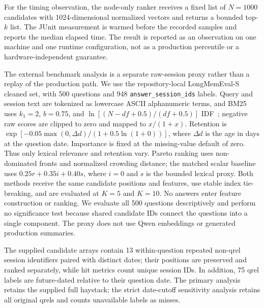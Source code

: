 \documentclass[review,12pt]{elsarticle}
\begin{document}
For the timing observation, the node-only ranker receives a fixed list of $N=1000$ candidates with 1024-dimensional normalized vectors and returns a bounded top-$k$ list. The JUnit measurement is warmed before the recorded samples and reports the median elapsed time. The result is reported as an observation on one machine and one runtime configuration, not as a production percentile or a hardware-independent guarantee.

The external benchmark analysis is a separate raw-session proxy rather than a replay of the production path. We use the repository-local LongMemEval-S cleaned set, with 500 questions and 948 \texttt{answer\_session\_ids} labels. Query and session text are tokenized as lowercase ASCII alphanumeric terms, and BM25 uses $k_1=2$, $b=0.75$, and $\ln[(N-df+0.5)/(df+0.5)]$ IDF~\cite{perez2009bm25lucene}; negative raw scores are clipped to zero and mapped to $x/(1+x)$. Retention is $\exp[-0.05\max(0,\Delta d)/(1+0.5\ln(1+0))]$, where $\Delta d$ is the age in days at the question date. Importance is fixed at the missing-value default of zero. Thus only lexical relevance and retention vary. Pareto ranking uses non-dominated fronts and normalized crowding distance; the matched scalar baseline uses $0.25r+0.35i+0.40s$, where $i=0$ and $s$ is the bounded lexical proxy. Both methods receive the same candidate positions and features, use stable index tie-breaking, and are evaluated at $K=5$ and $K=10$. No answers enter feature construction or ranking. We evaluate all 500 questions descriptively and perform no significance test because shared candidate IDs connect the questions into a single component. The proxy does not use Qwen embeddings or generated production summaries.

The supplied candidate arrays contain 13 within-question repeated non-qrel session identifiers paired with distinct dates; their positions are preserved and ranked separately, while hit metrics count unique session IDs. In addition, 75 qrel labels are future-dated relative to their question date. The primary analysis retains the supplied full haystack; the strict date-cutoff sensitivity analysis retains all original qrels and counts unavailable labels as misses.
\end{document}

